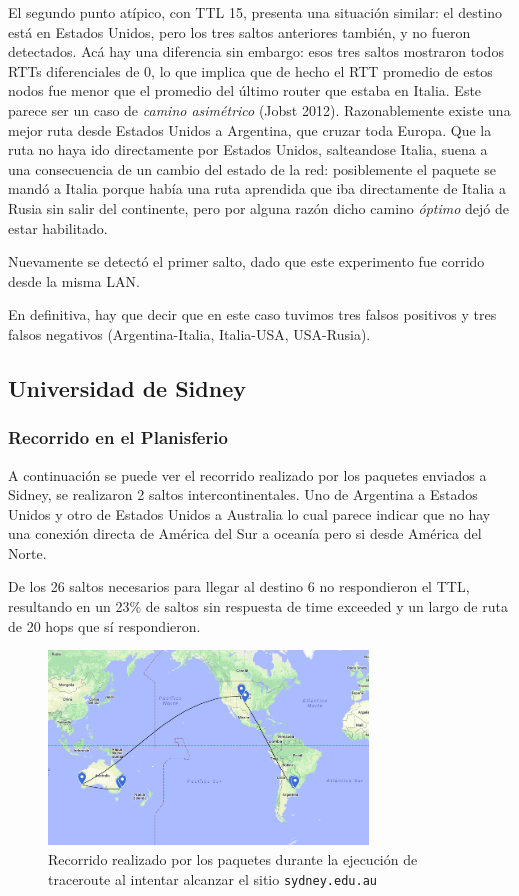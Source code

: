 El segundo punto atípico, con TTL 15, presenta una situación similar: el destino está en Estados Unidos, pero los tres saltos anteriores también, y no fueron detectados. Acá hay una diferencia sin embargo: esos tres saltos mostraron todos RTTs diferenciales de 0, lo que implica que de hecho el RTT promedio de estos nodos fue menor que el promedio del último router que estaba en Italia. Este parece ser un caso de \textit{camino asimétrico} (Jobst 2012). Razonablemente existe una mejor ruta desde Estados Unidos a Argentina, que cruzar toda Europa. Que la ruta no haya ido directamente por Estados Unidos, salteandose Italia, suena a una consecuencia de un cambio del estado de la red: posiblemente el paquete se mandó a Italia porque había una ruta aprendida que iba directamente de Italia a Rusia sin salir del continente, pero por alguna razón dicho camino \emph{óptimo} dejó de estar habilitado.

Nuevamente se detectó el primer salto, dado que este experimento fue corrido desde la misma LAN.

En definitiva, hay que decir que en este caso tuvimos tres falsos positivos y tres falsos negativos (Argentina-Italia, Italia-USA, USA-Rusia).

\subsection*{Universidad de Sidney}

\subsubsection*{Recorrido en el Planisferio}


A continuación se puede ver el recorrido realizado por los paquetes enviados a Sidney, se realizaron 2 saltos intercontinentales. Uno de Argentina a Estados Unidos y otro de Estados Unidos a Australia lo cual parece indicar que no hay una conexión directa de América del Sur a oceanía pero si desde América del Norte.

De los 26 saltos necesarios para llegar al destino 6 no respondieron el TTL, resultando en un 23\% de saltos sin respuesta de time exceeded y un largo de ruta de 20 hops que sí respondieron.

\begin{figure}[H]
  \centering
  \includegraphics[width=8.5cm]{figs/sidney.png}
  \caption{\footnotesize Recorrido realizado por los paquetes durante la ejecución de traceroute al intentar alcanzar el sitio \texttt{sydney.edu.au}}
\end{figure}

